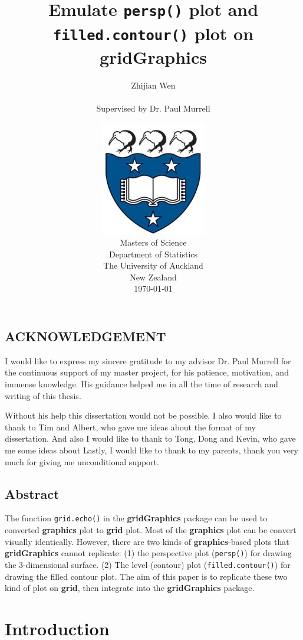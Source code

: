 \documentclass{report}
\title{\huge{Emulate \texttt{persp()} plot and \texttt{filled.contour()} plot on \textbf{gridGraphics}}}
\author{\Large{Zhijian Wen} \\ \\ \Large{Supervised by Dr. Paul Murrell}}
\date
{
\vspace{3cm}
\includegraphics[height = 5cm, width = 5cm]{logo.jpg}\\
\vspace{1cm}
Masters of Science\\
Department of Statistics\\
The University of Auckland\\
New Zealand\\
\today\\
}
\begin{document}

\setlength{\parindent}{1pt}
\noindent

\maketitle
\tableofcontents
\listoffigures

\newpage
\pagebreak
\hspace{0pt}
\vfill
\section*{ACKNOWLEDGEMENT}
I would like to express my sincere gratitude to my advisor Dr. Paul Murrell for the continuous support of my master project, for his patience, motivation, and immense knowledge. His guidance helped me in all the time of research and writing of this thesis. 

Without his help this dissertation would not be possible.
I also would like to thank to Tim and Albert, who gave me ideas about the format of my dissertation. And also I would like to thank to Tong, Dong and Kevin, who gave me some ideas about 
Lastly, I would like to thank to my parents, thank you very much for giving me unconditional support. 
\vfill
\hspace{0pt}
\pagebreak

\newpage
\pagebreak
\hspace{0pt}
\vfill
\section*{Abstract}
The function \texttt{grid.echo()} in the \textbf{gridGraphics} package can be used to converted \textbf{graphics} plot to \textbf{grid} plot. Most of the \textbf{graphics} plot can be convert visually identically. However, there are two kinds of \textbf{graphics}-based plots that \textbf{gridGraphics} cannot replicate: (1) the perspective plot (\texttt{persp()}) for drawing the 3-dimensional surface. (2) The level (contour) plot (\texttt{filled.contour()}) for drawing the filled contour plot. The aim of this paper is to replicate these two kind of plot on \textbf{grid}, then integrate into the \textbf{gridGraphics} package.
\vfill
\hspace{0pt}
\pagebreak



\chapter{Introduction}
\end{document}
